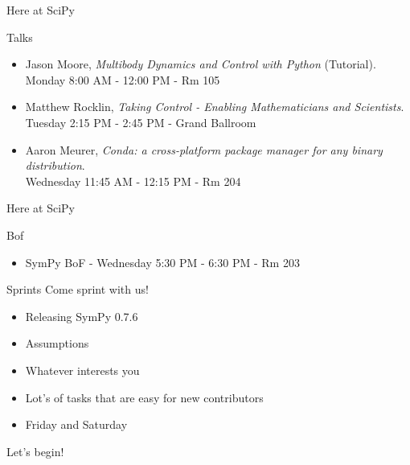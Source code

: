 \documentclass[xcolor=svgnames]{beamer}
\begin{document}
\begin{frame}{Here at SciPy}
  \begin{block}{Talks}
    \begin{itemize}
    \item \normalsize Jason Moore, \textit{Multibody Dynamics and Control with Python}
      (Tutorial). \\ \footnotesize Monday 8:00 AM - 12:00 PM - Rm 105
    \item \normalsize Matthew Rocklin, \textit{Taking Control - Enabling Mathematicians and Scientists}. \\ \footnotesize Tuesday 2:15
      PM - 2:45 PM - Grand Ballroom
    \item \normalsize Aaron Meurer, \textit{Conda: a cross-platform package manager for any binary distribution}. \\
      \footnotesize Wednesday 11:45 AM - 12:15 PM - Rm 204
    \end{itemize}
  \end{block}
\end{frame}

\begin{frame}{Here at SciPy}
  \begin{block}{Bof}
    \begin{itemize}
      \item SymPy BoF - Wednesday 5:30 PM - 6:30 PM - Rm 203
    \end{itemize}
  \end{block}
  \begin{block}{Sprints}
    Come sprint with us!
    \begin{itemize}
    \item Releasing SymPy 0.7.6
    \item Assumptions
    \item Whatever interests you
    \item Lot's of tasks that are easy for new contributors
    \item Friday and Saturday
    \end{itemize}
  \end{block}
\end{frame}

\begin{frame}
\Huge Let's begin!
\end{frame}
\end{document}
